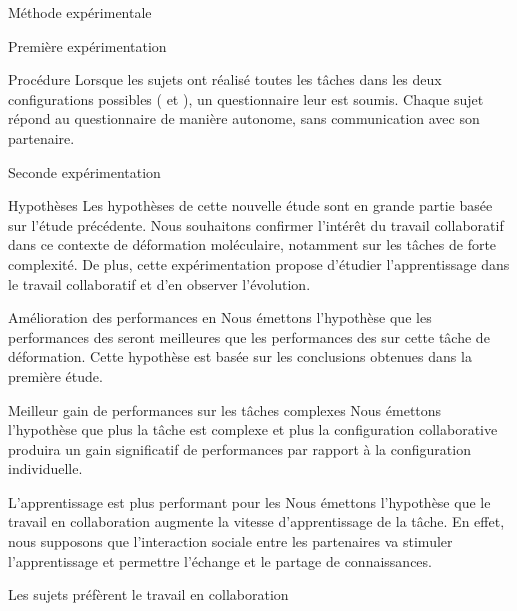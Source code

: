 \documentclass[myfrancais,ngerman,english,frenchb]{mythesis}
\begin{document}
\begin{mychapter}{Méthode expérimentale}
\begin{mysection}{Première expérimentation}
\begin{mysubsection}{Procédure}
				Lorsque les sujets ont réalisé toutes les tâches dans les deux configurations possibles ( et ), un questionnaire leur est soumis.
				Chaque sujet répond au questionnaire de manière autonome, sans communication avec son partenaire.
			\end{mysubsection}
		\end{mysection}
		\begin{mysection}{Seconde expérimentation}
			\begin{mysubsection}{Hypothèses}
				Les hypothèses de cette nouvelle étude sont en grande partie basée sur l'étude précédente.
				Nous souhaitons confirmer l'intérêt du travail collaboratif dans ce contexte de déformation moléculaire, notamment sur les tâches de forte complexité.
				De plus, cette expérimentation propose d'étudier l'apprentissage dans le travail collaboratif et d'en observer l'évolution.
				\begin{myparagraph}{ Amélioration des performances en }
					Nous émettons l'hypothèse que les performances des  seront meilleures que les performances des  sur cette tâche de déformation.
					Cette hypothèse est basée sur les conclusions obtenues dans la première étude.
				\end{myparagraph}
				\begin{myparagraph}{ Meilleur gain de performances sur les tâches complexes}
					Nous émettons l'hypothèse que plus la tâche est complexe et plus la configuration collaborative produira un gain significatif de performances par rapport à la configuration individuelle.
				\end{myparagraph}
				\begin{myparagraph}{ L'apprentissage est plus performant pour les }
					Nous émettons l'hypothèse que le travail en collaboration augmente la vitesse d'apprentissage de la tâche.
					En effet, nous supposons que l'interaction sociale entre les partenaires va stimuler l'apprentissage et permettre l'échange et le partage de connaissances.
				\end{myparagraph}
				\begin{myparagraph}{ Les sujets préfèrent le travail en collaboration}

\end{myparagraph}
\end{mysubsection}
\end{mysection}
\end{mychapter}
\end{document}
